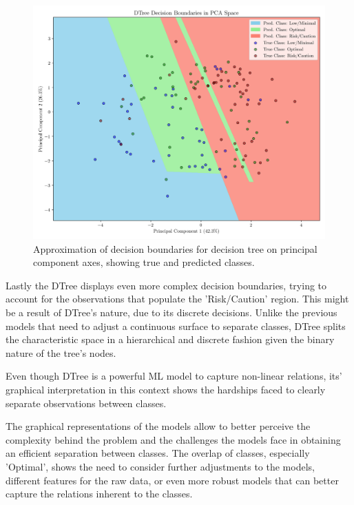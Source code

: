 \documentclass[conference]{IEEEtran}
\begin{document}
\begin{figure}[H]
    \centering
    \includegraphics[width=1\linewidth]{assets/pca_dtree.png}
    \caption{Approximation of decision boundaries for decision tree on principal component axes, showing true and predicted classes.}
    \label{pca_dtree}
\end{figure} %

Lastly the DTree displays even more complex decision boundaries, trying to account for the observations that populate the 'Risk/Caution' region. This might be a result of DTree's nature, due to its discrete decisions. Unlike the previous models that need to adjust a continuous surface to separate classes, DTree splits the characteristic space in a hierarchical and discrete fashion given the binary nature of the tree's nodes.

Even though DTree is a powerful ML model to capture non-linear relations, its' graphical interpretation in this context shows the hardships faced to clearly separate observations between classes.



The graphical representations of the models allow to better perceive the complexity behind the problem and the challenges the models face in obtaining an efficient separation between classes. The overlap of classes, especially 'Optimal', shows the need to consider further adjustments to the models, different features for the raw data, or even more robust models that can better capture the relations inherent to the classes.
\end{document}

